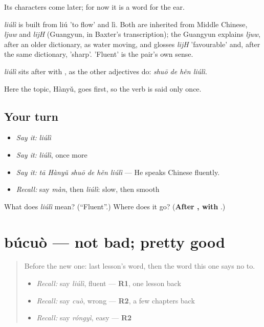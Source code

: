 Its characters come later; for now it is a word for the ear.

\begin{cousinweb}
\emph{liúlì} is built from liú 'to flow' and lì. Both are inherited from Middle Chinese, \emph{ljuw} and \emph{lijH} (Guangyun, in Baxter's transcription); the Guangyun explains \emph{ljuw}, after an older dictionary, as water moving, and glosses \emph{lijH} 'favourable' and, after the same dictionary, 'sharp'. 'Fluent' is the pair's own sense.
\end{cousinweb}

\begin{grammarlens}[title={What you've built}]
\emph{liúlì} sits after  with , as the other adjectives do: \emph{shuō de hěn liúlì}.

Here the topic, Hànyǔ, goes first, so the verb is said only once.
\end{grammarlens}

\subsection*{Your turn}
\begin{itemize}
\raggedright
  \item \emph{Say it:} \emph{liúlì}
  \item \emph{Say it:} \emph{liúlì}, once more
  \item \emph{Say it:} \emph{tā Hànyǔ shuō de hěn liúlì} — He speaks Chinese fluently.
  \item \emph{Recall:} say \emph{màn}, then \emph{liúlì}: slow, then smooth
\end{itemize}

\begin{tcolorbox}[breakable,colback=teal!4,colframe=teal!35!black,title={Before you move on}]
What does \emph{liúlì} mean? (\textquotedblleft{}Fluent\textquotedblright{}.) Where does it go? (\textbf{After , with }.)
\end{tcolorbox}
\section[búcuò]{búcuò — not bad; pretty good}

\label{lesson:ZH-C152-bucuo}



\begin{quote}
Before the new one: last lesson's word, then the word this one says no to.

\begin{itemize}
\raggedright
  \item \emph{Recall:} say \emph{liúlì}, fluent — \textbf{R1}, one lesson back
  \item \emph{Recall:} say \emph{cuò}, wrong — \textbf{R2}, a few chapters back
  \item \emph{Recall:} say \emph{róngyì}, easy — \textbf{R2}
\end{itemize}
\end{quote}

